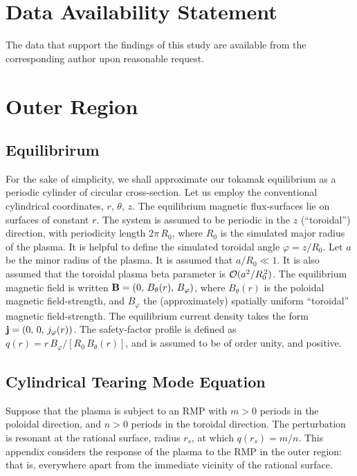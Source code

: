 \documentclass[12pt,prb,aps]{revtex4-1}
\begin{document}
\section*{Data Availability Statement}
The data that support the findings of this study are available from the corresponding author upon reasonable request.
\appendix

\section{Outer Region}\label{outer}
\subsection{Equilibrirum}\label{seq}
For the sake of simplicity, we shall approximate our tokamak equilibrium as a periodic cylinder of circular cross-section.\cite{ric3}
Let us employ the  conventional cylindrical coordinates, $r$, $\theta$, $z$. The
equilibrium magnetic flux-surfaces lie on surfaces of constant $r$. The system is
assumed to be periodic in the $z$ (``toroidal'') direction, with periodicity length $2\pi\,R_0$, 
where $R_0$ is the simulated  major radius of the plasma. It is helpful to define the simulated toroidal angle $\varphi=z/R_0$. Let $a$ be the minor radius of the plasma. It is assumed that $a/R_0\ll 1$. It is also assumed that the
toroidal plasma beta parameter is ${\cal O}(a^2/R_0^{\,2})$.\cite{ric3}  The equilibrium magnetic
field is written 
${\bf B} = (0,\,B_\theta(r),\, B_\varphi)$, 
  where $B_\theta(r)$ 
is the poloidal magnetic field-strength, and $B_\varphi$  the (approximately) spatially uniform  ``toroidal'' magnetic field-strength.  
The equilibrium current density takes the form
${\bf j} =(0,\,0,\,j_\varphi(r))$. The  safety-factor profile is defined as 
$q(r) = r\,B_\varphi/[R_0\,B_\theta(r)]$, and is assumed to be of order unity, and positive. 

\subsection{Cylindrical Tearing Mode Equation}
Suppose that the plasma is subject to an RMP with $m>0$ periods in the
poloidal direction, and $n>0$ periods in the toroidal direction. The perturbation is resonant at the rational surface, radius $r_s$, at which $q(r_s)=m/n$. 
This appendix considers the response of the plasma to the RMP in the outer region: that is, everywhere apart from the immediate vicinity of the rational surface. 
\end{document}
